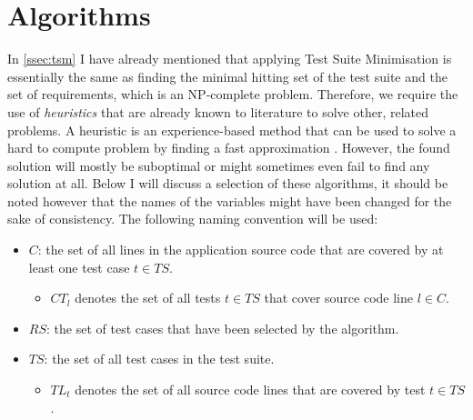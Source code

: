 
\section{Algorithms}
In \autoref{ssec:tsm} I have already mentioned that applying Test Suite Minimisation is essentially the same as finding the minimal hitting set of the test suite and the set of requirements, which is an NP-complete problem. Therefore, we require the use of \emph{heuristics} that are already known to literature to solve other, related problems. A heuristic is an experience-based method that can be used to solve a hard to compute problem by finding a fast approximation \cite{6588537}. However, the found solution will mostly be suboptimal or might sometimes even fail to find any solution at all. Below I will discuss a selection of these algorithms, it should be noted however that the names of the variables might have been changed for the sake of consistency. The following naming convention will be used:

\begin{itemize}
	\item $C$: the set of all lines in the application source code that are covered by at least one test case $t \in TS$.
		\begin{itemize}
			\item $CT_l$ denotes the set of all tests $t \in TS$ that cover source code line $l \in C$.
		\end{itemize}
	\item $RS$: the set of test cases that have been selected by the algorithm.
	\item $TS$: the set of all test cases in the test suite.
		\begin{itemize}
			\item $TL_t$ denotes the set of all source code lines that are covered by test $t \in TS$.
		\end{itemize}
\end{itemize}


\newpage

